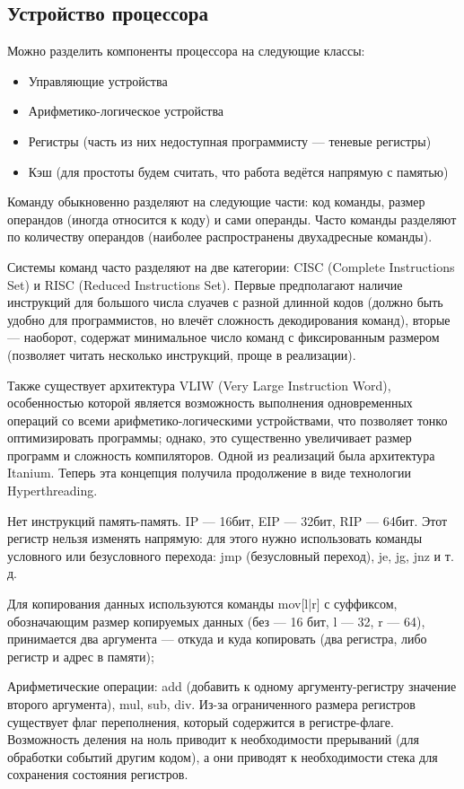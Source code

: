 \documentclass[main]{subfiles}
\begin{document}
\subsection{Устройство процессора}
Можно разделить компоненты процессора на следующие классы:
\begin{itemize}
\item Управляющие устройства
\item Арифметико-логическое устройства
\item Регистры (часть из них недоступная программисту ---
теневые регистры)
\item Кэш (для простоты будем считать, что работа ведётся напрямую с памятью)
\end{itemize}

Команду обыкновенно разделяют на следующие части:
код команды, размер операндов (иногда относится к коду) и сами операнды.
Часто команды разделяют по количеству операндов (наиболее распространены
двухадресные команды).

Системы команд часто разделяют на две категории:
CISC (Complete Instructions Set) и RISC (Reduced Instructions Set).
Первые предполагают наличие инструкций для большого числа слуачев
с разной длинной кодов
(должно быть удобно для программистов, но влечёт сложность декодирования
команд), вторые --- наоборот, содержат минимальное число команд с
фиксированным размером (позволяет читать несколько инструкций,
проще в реализации).

Также существует архитектура VLIW (Very Large Instruction Word),
особенностью которой является возможность выполнения одновременных
операций со всеми арифметико-логическими устройствами,
что позволяет тонко оптимизировать программы; однако, это
существенно увеличивает размер программ и сложность компиляторов.
Одной из реализаций была архитектура Itanium.
Теперь эта концепция получила продолжение в виде технологии
Hyperthreading.

Нет инструкций память-память.
IP --- 16бит, EIP --- 32бит, RIP --- 64бит.
Этот регистр нельзя изменять напрямую: для этого нужно использовать
команды условного или безусловного перехода:
jmp (безусловный переход), je, jg, jnz и т. д.

Для копирования данных используются команды mov[l|r] с суффиксом, обозначающим
размер копируемых данных (без --- 16 бит, l --- 32, r --- 64), принимается
два аргумента --- откуда и куда копировать (два регистра, либо регистр и адрес в памяти);

Арифметические операции: add (добавить к одному аргументу-регистру значение второго
аргумента), mul, sub, div. Из-за ограниченного размера регистров существует флаг
переполнения, который содержится в регистре-флаге. Возможность деления на ноль
приводит к необходимости прерываний (для обработки событий другим кодом),
а они приводят к необходимости стека для сохранения состояния регистров.
\end{document}
